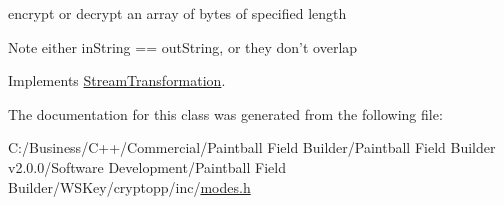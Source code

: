 encrypt or decrypt an array of bytes of specified length \begin{DoxyNote}{Note}
either inString == outString, or they don't overlap 
\end{DoxyNote}


Implements \hyperlink{class_stream_transformation_a26feabde21bc4d1783195969733e3bb0}{StreamTransformation}.

The documentation for this class was generated from the following file:\begin{DoxyCompactItemize}
\item 
C:/Business/C++/Commercial/Paintball Field Builder/Paintball Field Builder v2.0.0/Software Development/Paintball Field Builder/WSKey/cryptopp/inc/\hyperlink{modes_8h}{modes.h}\end{DoxyCompactItemize}
